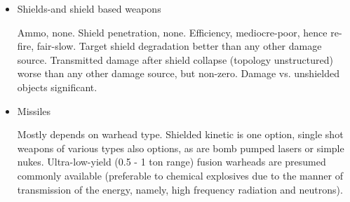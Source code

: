 \begin{itemize}
\item Shields-and shield based weapons

Ammo, none. Shield penetration, none. Efficiency, mediocre-poor, hence
re-fire, fair-slow. Target shield degradation better than any other
damage source. Transmitted damage after shield collapse (topology
unstructured) worse than any other damage source, but non-zero. Damage
vs. unshielded objects significant.

\item Missiles

Mostly depends on warhead type. Shielded kinetic is one option, single
shot weapons of various types also options, as are bomb pumped lasers
or simple nukes. Ultra-low-yield (0.5 - 1 ton range) fusion warheads
are presumed commonly available (preferable to chemical explosives due
to the manner of transmission of the energy, namely, high frequency
radiation and neutrons).
\end{itemize}


